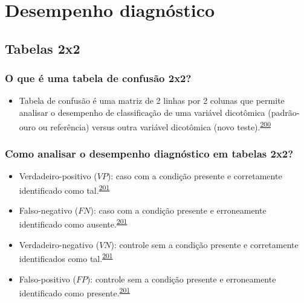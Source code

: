 \documentclass[
  a4paper,
]{book}
\providecommand{\tightlist}{%
  \setlength{\itemsep}{0pt}\setlength{\parskip}{0pt}}
\begin{document}
\hypertarget{analise-desempenho-diagnostico}{%
\chapter{\texorpdfstring{\textbf{Desempenho diagnóstico}}{Desempenho diagnóstico}}\label{analise-desempenho-diagnostico}}

\hypertarget{tabelas-2x2}{%
\section{Tabelas 2x2}\label{tabelas-2x2}}

\hypertarget{o-que-uxe9-uma-tabela-de-confusuxe3o-2x2}{%
\subsection{O que é uma tabela de confusão 2x2?}\label{o-que-uxe9-uma-tabela-de-confusuxe3o-2x2}}

\begin{itemize}
\tightlist
\item
  Tabela de confusão é uma matriz de 2 linhas por 2 colunas que permite analisar o desempenho de classificação de uma variável dicotômica (padrão-ouro ou referência) versus outra variável dicotômica (novo teste).\textsuperscript{\protect\hyperlink{ref-steckelberg2004}{200}}
\end{itemize}

\hypertarget{como-analisar-o-desempenho-diagnuxf3stico-em-tabelas-2x2}{%
\subsection{Como analisar o desempenho diagnóstico em tabelas 2x2?}\label{como-analisar-o-desempenho-diagnuxf3stico-em-tabelas-2x2}}

\begin{itemize}
\item
  Verdadeiro-positivo (\(VP\)): caso com a condição presente e corretamente identificado como tal.\textsuperscript{\protect\hyperlink{ref-greenhalgh1997b}{201}}
\item
  Falso-negativo (\(FN\)): caso com a condição presente e erroneamente identificado como ausente.\textsuperscript{\protect\hyperlink{ref-greenhalgh1997b}{201}}
\item
  Verdadeiro-negativo (\(VN\)): controle sem a condição presente e corretamente identificados como tal.\textsuperscript{\protect\hyperlink{ref-greenhalgh1997b}{201}}
\item
  Falso-positivo (\(FP\)): controle sem a condição presente e erroneamente identificado como presente.\textsuperscript{\protect\hyperlink{ref-greenhalgh1997b}{201}}
\end{itemize}
\end{document}
